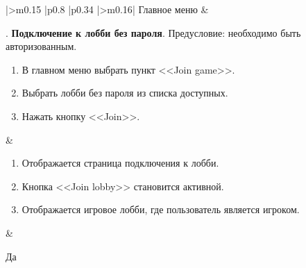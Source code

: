 \begin{landscape}
\begin{longtable}[l]{|>{\centering}m{0.15\textwidth}
					  |p{0.8\textwidth}
					  |p{0.34\textwidth}
					  |>{\centering\arraybackslash}m{0.16\textwidth}|}
	Главное меню &
	\begin{minipage}[t]{1\linewidth}
		\vspace{-1\baselineskip}
		\testnumber. \textbf{Подключение к лобби без пароля}.\newline
 		Предусловие: необходимо быть авторизованным.
 		\begin{enumerate}
			\item В главном меню выбрать пункт <<Join game>>.
			\item Выбрать лобби без пароля из списка доступных.
			\item Нажать кнопку <<Join>>.
 		\end{enumerate}
 	\end{minipage} &
	\begin{minipage}[t]{1\linewidth}
		\vspace{-1\baselineskip}
		\begin{enumerate}
			\item Отображается страница подключения к лобби.
			\item Кнопка <<Join lobby>> становится активной.
   			\item Отображается игровое лобби, где пользователь является игроком.
		\end{enumerate}
	\end{minipage} &
	\begin{minipage}[t]{1\linewidth}
		\vspace{-1\baselineskip}
		\centering Да
	\end{minipage} \\
	\hline


\end{longtable}
\end{landscape}
